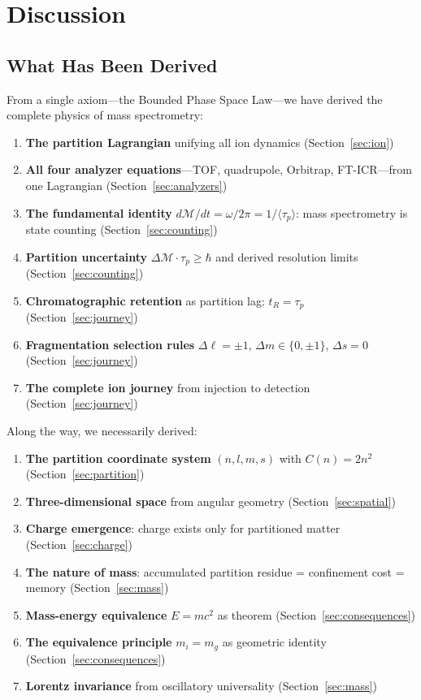 \documentclass[twocolumn,10pt,a4paper]{article}
\theoremstyle{definition}
\theoremstyle{remark}
\newcommand{\Depth}{\mathcal{M}}
\newcommand{\taup}{\tau_p}
\begin{document}
\section{Discussion}
\label{sec:discussion}

\subsection{What Has Been Derived}

From a single axiom---the Bounded Phase Space Law---we have derived the complete physics of mass spectrometry:

\begin{enumerate}
    \item \textbf{The partition Lagrangian} unifying all ion dynamics (Section~\ref{sec:ion})
    \item \textbf{All four analyzer equations}---TOF, quadrupole, Orbitrap, FT-ICR---from one Lagrangian (Section~\ref{sec:analyzers})
    \item \textbf{The fundamental identity} $d\Depth/dt = \omega/2\pi = 1/\langle\taup\rangle$: mass spectrometry is state counting (Section~\ref{sec:counting})
    \item \textbf{Partition uncertainty} $\Delta\Depth \cdot \taup \geq \hbar$ and derived resolution limits (Section~\ref{sec:counting})
    \item \textbf{Chromatographic retention} as partition lag: $t_R = \taup$ (Section~\ref{sec:journey})
    \item \textbf{Fragmentation selection rules} $\Delta\ell = \pm 1$, $\Delta m \in \{0, \pm 1\}$, $\Delta s = 0$ (Section~\ref{sec:journey})
    \item \textbf{The complete ion journey} from injection to detection (Section~\ref{sec:journey})
\end{enumerate}

Along the way, we necessarily derived:
\begin{enumerate}[resume]
    \item \textbf{The partition coordinate system} $(n, l, m, s)$ with $C(n) = 2n^2$ (Section~\ref{sec:partition})
    \item \textbf{Three-dimensional space} from angular geometry (Section~\ref{sec:spatial})
    \item \textbf{Charge emergence}: charge exists only for partitioned matter (Section~\ref{sec:charge})
    \item \textbf{The nature of mass}: accumulated partition residue = confinement cost = memory (Section~\ref{sec:mass})
    \item \textbf{Mass-energy equivalence} $E = mc^2$ as theorem (Section~\ref{sec:consequences})
    \item \textbf{The equivalence principle} $m_i = m_g$ as geometric identity (Section~\ref{sec:consequences})
    \item \textbf{Lorentz invariance} from oscillatory universality (Section~\ref{sec:mass})
\end{enumerate}
\end{document}
